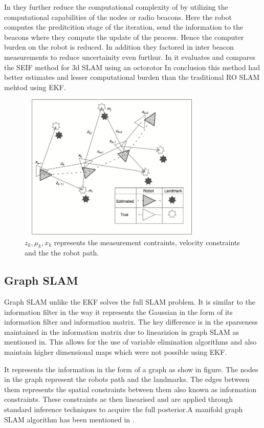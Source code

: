 \documentclass[conference]{IEEEtran}
\begin{document}
In \cite{Torres-Gonzalez2014} they further reduce the computational complexity of by utilizing the computational capabilities of the nodes or radio  beacons. Here the robot computes the preditcition stage of the iteration, send the information to the beacons where they compute the update of the process. Hence the computer burden on the robot is reduced. In addition they factored in inter beacon measurements to reduce uncertainity even furthur. In \cite{Torres-Gonzalez2017} it evaluates and compares  the SEIF method for 3d SLAM using an octorotor In conclusion this method had better estimates and lesser computational burden than the traditional RO SLAM mehtod using EKF. 

\begin{figure}[h!]
	\centering
	\includegraphics[height=70mm,width=90mm]{graph_slam.PNG}
	\caption{$z_k,\mu_k,x_k$ represents the measurement contraints, velocity constraints and the the robot path.}
	
\end{figure}

	
	
	
\subsection{Graph SLAM}
Graph SLAM unlike the EKF solves the full SLAM problem. It is similar to the information filter in the way it represents the Gaussian  in the form of its information filter and information matrix. The key difference is in the sparseness maintained in the information matrix due to linearizion in graph SLAM as mentioned in\cite{Thrun2002a}. This allows for the use of variable elimination algorithms and also maintain higher dimensional maps which were not possible using EKF.

It represents the information in the form of a graph as show in figure. The nodes in the graph represent the robots path and the landmarks. The edges between them represents the spatial  constraints between them also known as information constraints. These constraints ae then linearised and are applied through standard inference techniques to acquire the full posterior.A manifold graph SLAM algorithm has been mentioned in \cite{Grisetti}.
	
\end{document}
